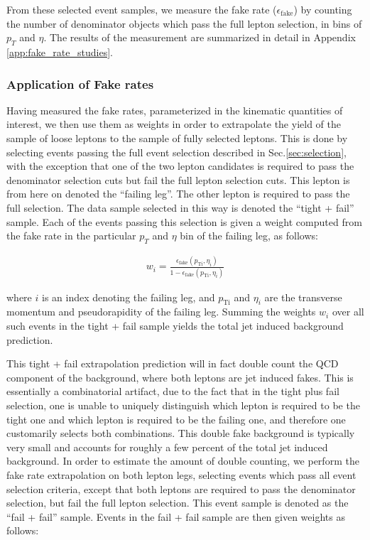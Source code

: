 From these selected event samples, we measure the fake rate 
($\epsilon_{\mathrm{fake}}$) by counting the number of denominator 
objects which pass the full lepton selection, in bins of $p_{T}$
and $\eta$. The results of the measurement are summarized in detail
in Appendix \ref{app:fake_rate_studies}.



\subsubsection{Application of Fake rates}
\label{sec:fakerateApplication}

Having measured the fake rates, parameterized in the kinematic quantities of interest,
we then use them as weights in order to extrapolate the yield of the sample of loose
leptons to the sample of fully selected leptons. This is done by selecting events
passing the full event selection described in Sec.\ref{sec:selection}, 
with the exception that one of the two lepton
candidates is required to pass the denominator selection cuts but fail the full 
lepton selection cuts. This lepton is from here on denoted the ``failing leg''. 
The other lepton is required to pass the full selection.
The data sample selected in this way is denoted the ``tight + fail'' sample.
Each of the events passing this selection is given a weight computed from
the fake rate in the particular $p_{T}$ and $\eta$ bin of the 
failing leg, as follows:

\begin{eqnarray}
  w_{i} = \frac{\epsilon_{\mathrm{fake}}(p_{\mathrm{T i}},\eta_{i})}{1 - \epsilon_{\mathrm{fake}}(p_{\mathrm{T i}},\eta_{i})}
\end{eqnarray}

where $i$ is an index denoting the failing leg, and $p_{\mathrm{T i}}$ and $\eta_{i}$
are the transverse momentum and pseudorapidity of the failing leg. 
Summing the weights $w_{i}$ over all such events in the tight + fail sample yields
the total jet induced background prediction.

This tight + fail extrapolation prediction will in fact 
double count the QCD component of the background, where both leptons are jet induced
fakes. This is essentially a combinatorial artifact, due to the fact that in the tight
plus fail selection, one is unable to uniquely distinguish which lepton is required to
be the tight one and which lepton is required to be the failing one, and therefore
one customarily selects both combinations. This double fake background is 
typically very small and accounts for roughly a few percent of the total jet
induced background. In order to estimate the amount of double counting,
we perform the fake rate extrapolation on both lepton legs, selecting events
which pass all event selection criteria, except that both leptons are required
to pass the denominator selection, but fail the full lepton selection. This
event sample is denoted as the ``fail + fail'' sample. Events in the fail + fail
sample are then given weights as follows:

